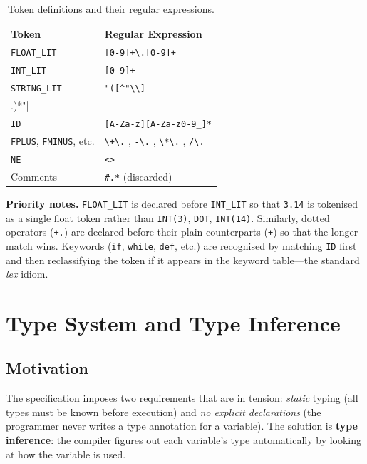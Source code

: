 \documentclass[12pt,a4paper]{report}
\begin{document}
\begin{table}[H]
\centering
\caption{Token definitions and their regular expressions.}
\label{tab:tokens}
\begin{tabular}{@{} l l @{}}
\toprule
\textbf{Token} & \textbf{Regular Expression} \\
\midrule
\texttt{FLOAT\_LIT}  & \verb|[0-9]+\.[0-9]+| \\
\texttt{INT\_LIT}    & \verb|[0-9]+| \\
\texttt{STRING\_LIT} & \verb|"([^"\\]|\\.)*"| \\
\texttt{ID}          & \verb|[A-Za-z][A-Za-z0-9_]*| \\
\texttt{FPLUS}, \texttt{FMINUS}, etc. & \verb|\+\.| , \verb|-\.| , \verb|\*\.| , \verb|/\.| \\
\texttt{NE}          & \verb|<>| \\
Comments             & \verb|#.*| (discarded) \\
\bottomrule
\end{tabular}
\end{table}

\textbf{Priority notes.}
\texttt{FLOAT\_LIT} is declared before \texttt{INT\_LIT} so that
\texttt{3.14} is tokenised as a single float token rather than
\texttt{INT(3)}, \texttt{DOT}, \texttt{INT(14)}. Similarly, dotted operators
(\texttt{+.}) are declared before their plain counterparts (\texttt{+}) so
that the longer match wins. Keywords (\texttt{if}, \texttt{while},
\texttt{def}, etc.) are recognised by matching \texttt{ID} first and then
reclassifying the token if it appears in the keyword table---the standard
\textit{lex} idiom.

\chapter{Type System and Type Inference}
\label{sec:typesystem}
 
\section{Motivation}
 
The specification imposes two requirements that are in tension:
\emph{static} typing (all types must be known before execution) and \emph{no
explicit declarations} (the programmer never writes a type annotation for a
variable). The solution is \textbf{type inference}: the compiler figures out
each variable's type automatically by looking at how the variable is used.
 
\end{document}
